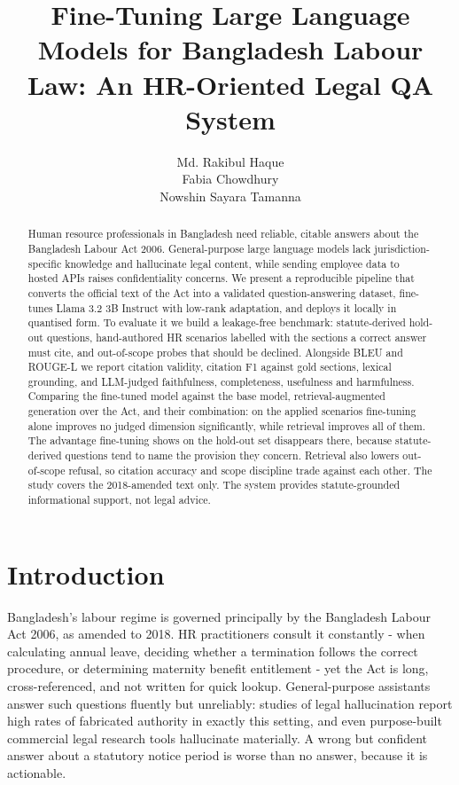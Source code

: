 \documentclass[11pt,a4paper]{article}
\title{Fine-Tuning Large Language Models for Bangladesh Labour Law: An HR-Oriented Legal QA System}
\author{Md. Rakibul Haque \\ Fabia Chowdhury \\ Nowshin Sayara Tamanna}
\date{}
\begin{document}
\maketitle
\vspace{1em}

\begin{abstract}
\noindent Human resource professionals in Bangladesh need reliable, citable answers about the Bangladesh Labour Act 2006\cite{ref_act}. General-purpose large language models lack jurisdiction-specific knowledge and hallucinate legal content\cite{ref_hallucination,ref_legaltools}, while sending employee data to hosted APIs raises confidentiality concerns. We present a reproducible pipeline that converts the official text of the Act into a validated question-answering dataset, fine-tunes Llama 3.2 3B Instruct\cite{ref_llama3} with low-rank adaptation\cite{ref_lora}, and deploys it locally in quantised form. To evaluate it we build a leakage-free benchmark: statute-derived hold-out questions, hand-authored HR scenarios labelled with the sections a correct answer must cite, and out-of-scope probes that should be declined. Alongside BLEU\cite{ref_bleu} and ROUGE-L\cite{ref_rouge} we report citation validity, citation F1 against gold sections, lexical grounding, and LLM-judged faithfulness, completeness, usefulness and harmfulness. Comparing the fine-tuned model against the base model, retrieval-augmented generation\cite{ref_rag} over the Act, and their combination: on the applied scenarios fine-tuning alone improves no judged dimension significantly, while retrieval improves all of them. The advantage fine-tuning shows on the hold-out set disappears there, because statute-derived questions tend to name the provision they concern. Retrieval also lowers out-of-scope refusal, so citation accuracy and scope discipline trade against each other. The study covers the 2018-amended text only. The system provides statute-grounded informational support, not legal advice.
\end{abstract}

\section{Introduction}
Bangladesh's labour regime is governed principally by the Bangladesh Labour Act 2006, as amended to 2018\cite{ref_act}. HR practitioners consult it constantly - when calculating annual leave, deciding whether a termination follows the correct procedure, or determining maternity benefit entitlement - yet the Act is long, cross-referenced, and not written for quick lookup. General-purpose assistants answer such questions fluently but unreliably: studies of legal hallucination report high rates of fabricated authority in exactly this setting\cite{ref_hallucination}, and even purpose-built commercial legal research tools hallucinate materially\cite{ref_legaltools}. A wrong but confident answer about a statutory notice period is worse than no answer, because it is actionable.
\end{document}
